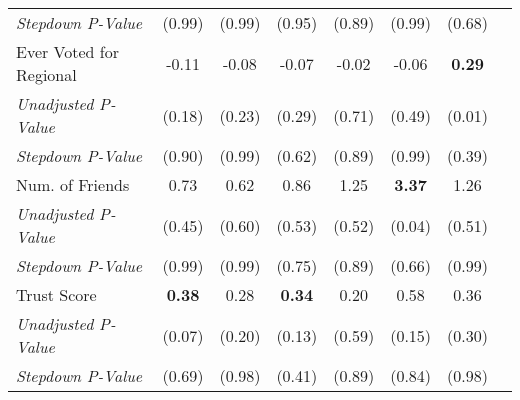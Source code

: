 \begin{tabular}{l c c c c c c c}
\quad \textit{Stepdown P-Value} & (0.99) & (0.99) & (0.95) & (0.89) & (0.99) & (0.68) \\
Ever Voted for Regional & -0.11 & -0.08 & -0.07 & -0.02 & -0.06 & \textbf{ 0.29 } \\
\quad \textit{Unadjusted P-Value} & (0.18) & (0.23) & (0.29) & (0.71) & (0.49) & (0.01) \\
\quad \textit{Stepdown P-Value} & (0.90) & (0.99) & (0.62) & (0.89) & (0.99) & (0.39) \\
Num. of Friends & 0.73 & 0.62 & 0.86 & 1.25 & \textbf{ 3.37 } & 1.26 \\
\quad \textit{Unadjusted P-Value} & (0.45) & (0.60) & (0.53) & (0.52) & (0.04) & (0.51) \\
\quad \textit{Stepdown P-Value} & (0.99) & (0.99) & (0.75) & (0.89) & (0.66) & (0.99) \\
Trust Score & \textbf{ 0.38 } & 0.28 & \textbf{ 0.34 } & 0.20 & 0.58 & 0.36 \\
\quad \textit{Unadjusted P-Value} & (0.07) & (0.20) & (0.13) & (0.59) & (0.15) & (0.30) \\
\quad \textit{Stepdown P-Value} & (0.69) & (0.98) & (0.41) & (0.89) & (0.84) & (0.98) \\
\bottomrule
\end{tabular}
